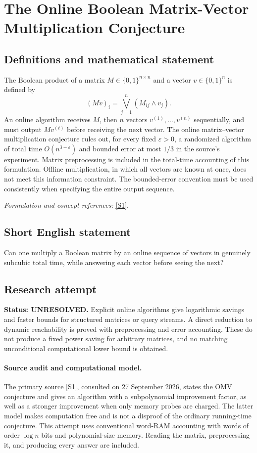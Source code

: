 \documentclass[11pt]{article}
\begin{document}
\section*{\texorpdfstring{The Online Boolean Matrix-Vector Multiplication Conjecture}{The Online Boolean Matrix-Vector Multiplication Conjecture}}\label{30006852}
\subsection{Definitions and mathematical statement}
The Boolean product of a matrix $M\in\{0,1\}^{n\times n}$ and a vector $v\in\{0,1\}^n$ is defined by
\[
 (Mv)_i=\bigvee_{j=1}^n(M_{ij}\wedge v_j).
\]
An online algorithm receives $M$, then $n$ vectors $v^{(1)},\ldots,v^{(n)}$ sequentially, and must output $Mv^{(t)}$ before receiving the next vector. The online matrix--vector multiplication conjecture rules out, for every fixed ${\varepsilon}>0$, a randomized algorithm of total time $O(n^{3-{\varepsilon}})$ and bounded error at most $1/3$ in the source's experiment. Matrix preprocessing is included in the total-time accounting of this formulation. Offline multiplication, in which all vectors are known at once, does not meet this information constraint. The bounded-error convention must be used consistently when specifying the entire output sequence.
\par\smallskip\textit{Formulation and concept references:} \href{https://people.csail.mit.edu/virgi/6.1420/papers/omvalg.pdf}{[S1]}.

\subsection{Short English statement}
Can one multiply a Boolean matrix by an online sequence of vectors in genuinely subcubic total time, while answering each vector before seeing the next?
\subsection{Research attempt}
\textbf{Status: UNRESOLVED.} Explicit online algorithms give logarithmic savings and faster bounds for structured matrices or query streams. A direct reduction to dynamic reachability is proved with preprocessing and error accounting. These do not produce a fixed power saving for arbitrary matrices, and no matching unconditional computational lower bound is obtained.

\paragraph{Source audit and computational model.}
The primary source [S1], consulted on 27 September 2026, states the OMV conjecture and gives an algorithm with a subpolynomial improvement factor, as well as a stronger improvement when only memory probes are charged. The latter model makes computation free and is not a disproof of the ordinary running-time conjecture. This attempt uses conventional word-RAM accounting with words of order $\log n$ bits and polynomial-size memory. Reading the matrix, preprocessing it, and producing every answer are included.
\end{document}
